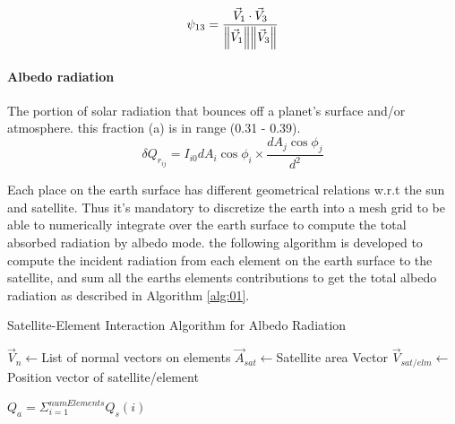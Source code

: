 \documentclass[11pt]{article}
\begin{document}
\begin{equation}\label{eq:psi13}
    \psi_{13} = \frac{\vec{V}_1\cdot \vec{V}_3}{\norm{\vec{V}_1}\norm{\vec{V}_3}}
\end{equation}

\paragraph{Albedo radiation} 
The portion of solar radiation that bounces off a planet's surface and/or atmosphere. this fraction (a) is in range (0.31 - 0.39). 
\begin{equation}
    \delta Q_{r_{ij}} = I_{i0} dA_i\cos{\phi_i}\times\frac{dA_j \cos{\phi_j}}{d^2}
\end{equation}

Each place on the earth surface has different geometrical relations w.r.t the sun and satellite. Thus it's mandatory to discretize the earth into a mesh grid to be able to numerically integrate over the earth surface to compute the total absorbed radiation by albedo mode. the following algorithm is developed to compute the incident radiation from each element on the earth surface to the satellite, and sum all the earths elements contributions to get the total albedo radiation as described in Algorithm \ref{alg:01}.




{}

\begin{algorithm}[hbt!]
\caption{Satellite-Element Interaction Algorithm for Albedo Radiation}\label{alg:two}
\label{alg:01}
$\vec{V}_{n} \gets $List of normal vectors on elements\;
$\vec{A}_{sat} \gets $Satellite area Vector\;
$\vec{V}_{sat/elm} \gets$ Position vector of satellite/element\;

        
    $Q_a = \Sigma_{i=1}^{numElements}{Q_s(i)}  $
\end{algorithm}
\end{document}
